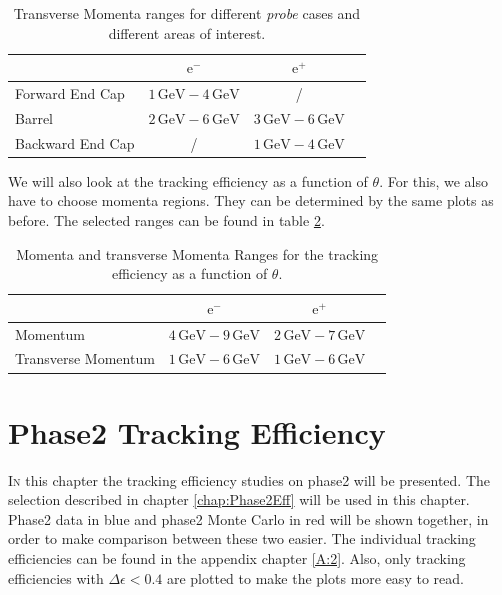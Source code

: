 \documentclass[a4paper,11pt,twosided,final,german,openbib,pdftex,listof=totoc,bibliography=totoc]{scrbook}
\begin{document}
\begin{table}[h!]
	\centering
	\begin{tabular}{lccc}
		&$\textrm{e}^-$ &$\textrm{e}^+$\\
		\hline
		Forward End Cap &$1\,\textrm{GeV} - 4\,\textrm{GeV}$&/\\
		Barrel &$2\,\textrm{GeV} - 6\,\textrm{GeV}$&$3\,\textrm{GeV} - 6\,\textrm{GeV}$\\
		Backward End Cap & /&$1\,\textrm{GeV} - 4\,\textrm{GeV}$\\
	\end{tabular}
	
	\caption[Areas Of Interest Different Transverse Momenta Ranges]{Transverse Momenta ranges for different \textit{probe} cases and different areas of interest.}
	\label{tab:RTPtMDTable}
\end{table}








We will also look at the tracking efficiency as a function of $\theta$. For this, we also have to choose momenta regions. They can be determined by the same plots as before.
The selected ranges can be found in table \ref{tab:RTPMDThetaTable}.

\begin{table}[h!]
	\centering
	\begin{tabular}{lccc}
		&$\textrm{e}^-$ &$\textrm{e}^+$\\
		\hline
		Momentum &$4\,\textrm{GeV} - 9\,\textrm{GeV}$&$2\,\textrm{GeV} - 7\,\textrm{GeV}$\\
		Transverse Momentum &$1\,\textrm{GeV} - 6\,\textrm{GeV}$&$1\,\textrm{GeV} - 6\,\textrm{GeV}$\\

	\end{tabular}
	
	\caption[Different (Transverse-) Momenta Ranges For $\theta$ Efficiency]{Momenta and transverse Momenta Ranges for the tracking efficiency as a function of $\theta$.}
	\label{tab:RTPMDThetaTable}
\end{table}




\chapter{Phase2 Tracking Efficiency}
\label{chp:TrackingEfficiencyPhase2}



\lettrine{I}{n} this chapter the tracking efficiency studies on phase2 will be presented. The selection described in chapter \ref{chap:Phase2Eff} will be used in this chapter. Phase2 data in blue and phase2 Monte Carlo in red will be shown together, in order to make comparison between these two easier. The individual tracking efficiencies can be found in the appendix chapter \ref{A:2}. Also, only tracking efficiencies with $\Delta \epsilon < 0.4$ are plotted to make the plots more easy to read. 
 
\end{document}
